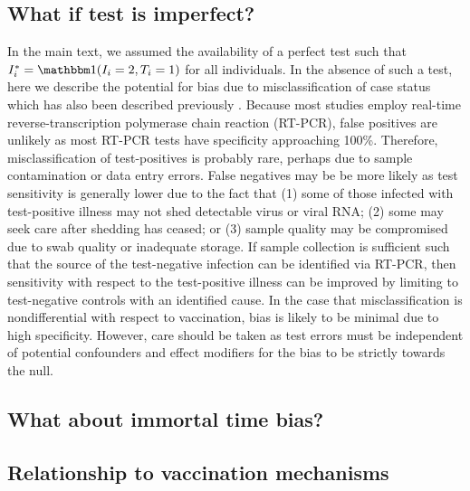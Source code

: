 \begin{appendix}
\subsection{What if test is imperfect?}
In the main text, we assumed the availability of a perfect test such that $I^*_i = \mathbbm 1 (I_i = 2, T_i = 1)$ for all individuals. In the absence of such a test, here we describe the potential for bias due to misclassification of case status which has also been described previously \cite{sullivan_theoretical_2016}. Because most studies employ real-time reverse-transcription polymerase chain reaction (RT-PCR), false positives are unlikely as most RT-PCR tests have specificity approaching 100\%. Therefore, misclassification of test-positives is probably rare, perhaps due to sample contamination or data entry errors. False negatives may be be more likely as test sensitivity is generally lower due to the fact that (1) some of those infected with test-positive illness may not shed detectable virus or viral RNA; (2) some may seek care after shedding has ceased; or (3) sample quality may be compromised due to swab quality or inadequate storage. If sample collection is sufficient such that the source of the test-negative infection can be identified via RT-PCR, then sensitivity with respect to the test-positive illness can be improved by limiting to test-negative controls with an identified cause. In the case that misclassification is nondifferential with respect to vaccination, bias is likely to be minimal due to high specificity. However, care should be taken as test errors must be independent of potential confounders and effect modifiers for the bias to be strictly towards the null. 

\subsection{What about immortal time bias?}

\subsection{Relationship to vaccination mechanisms}


\end{appendix}

